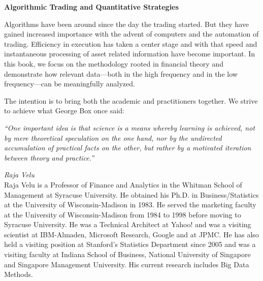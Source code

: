 
\begin{center} {\large\bfseries Algorithmic Trading and Quantitative Strategies} \end{center}

Algorithms have been around since the day the trading started. But they have gained increased importance with the advent of computers and the automation of trading. Efficiency in execution has taken a center stage and with that speed and instantaneous processing of asset related information have become important. In this book, we focus on the methodology rooted in financial theory and demonstrate how relevant data---both in the high frequency and in the low frequency---can be meaningfully analyzed. 


The intention is to bring both the academic and practitioners together. We strive to achieve what George Box once said: \par
\begin{center}
\begin{minipage}[t]{0.7\textwidth}
	\raggedright
  	{\itshape``One important idea is that science is a means whereby learning is achieved, not by mere theoretical speculation on the one hand, nor by the undirected accumulation of practical facts on the other, but rather by a motivated iteration between theory and practice.''}
\end{minipage} 
\end{center}


\newpage


{\noindent\large\itshape Raja Velu} \\[0.2cm]
\noindent Raja Velu is a Professor of Finance and Analytics in the Whitman School of Management at Syracuse University. He obtained his Ph.D. in Business/Statistics at the University of Wisconsin-Madison in 1983. He served the marketing faculty at the University of Wisconsin-Madison from 1984 to 1998 before moving to Syracuse University. He was a Technical Architect at Yahoo! and was a visiting scientist at IBM-Almaden, Microsoft Research, Google and at JPMC. He has also held a visiting position at Stanford's Statistics Department since 2005 and was a visiting faculty at Indiana School of Business, National University of Singapore and Singapore Management University. His current research includes Big Data Methods. \\


